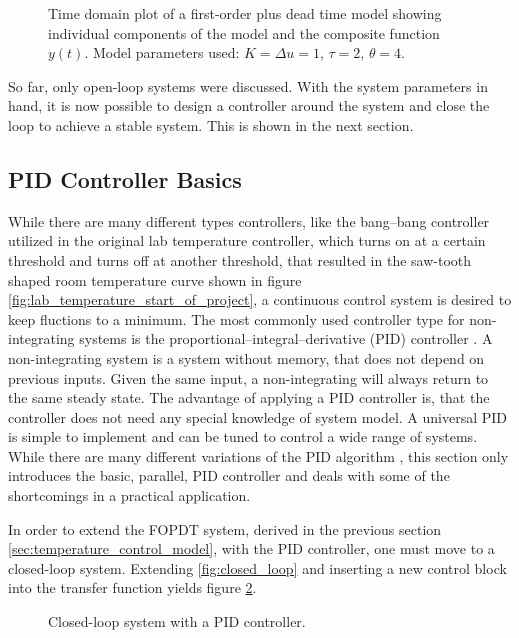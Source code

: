 \begin{figure}[ht]
    \centering
    
    \caption{Time domain plot of a first-order plus dead time model showing individual components of the model and the composite function $y(t)$. Model parameters used: $K= \Delta u = 1$, $\tau=2$, $\theta=4$.}
    \label{fig:fopdt}
\end{figure}

So far, only open-loop systems were discussed. With the system parameters in hand, it is now possible to design a controller around the system and close the loop to achieve a stable system. This is shown in the next section.

\clearpage
\subsection{PID Controller Basics}
\label{sec:pid_tuning_rules}
While there are many different types controllers, like the bang–bang controller utilized in the original lab temperature controller, which turns on at a certain threshold and turns off at another threshold, that resulted in the saw-tooth shaped room temperature curve shown in figure \ref{fig:lab_temperature_start_of_project}, a continuous control system is desired to keep fluctions to a minimum. The most commonly used controller type for non-integrating systems is the proportional–integral–derivative (PID) controller \cite{pid_in_industry}. A non-integrating system is a system without memory, that does not depend on previous inputs. Given the same input, a non-integrating will always return to the same steady state. The advantage of applying a PID controller is, that the controller does not need any special knowledge of system model. A universal PID is simple to implement and can be tuned to control a wide range of systems. While there are many different variations of the PID algorithm \cite{pid_controller}, this section only introduces the basic, parallel, PID controller and deals with some of the shortcomings in a practical application.

In order to extend the FOPDT system, derived in the previous section \ref{sec:temperature_control_model}, with the PID controller, one must move to a closed-loop system. Extending \ref{fig:closed_loop} and inserting a new control block into the transfer function yields figure \ref{fig:closed_loop_pid}.
\begin{figure}[ht]
    \centering
    \caption{Closed-loop system with a PID controller.}
    \label{fig:closed_loop_pid}
\end{figure}

